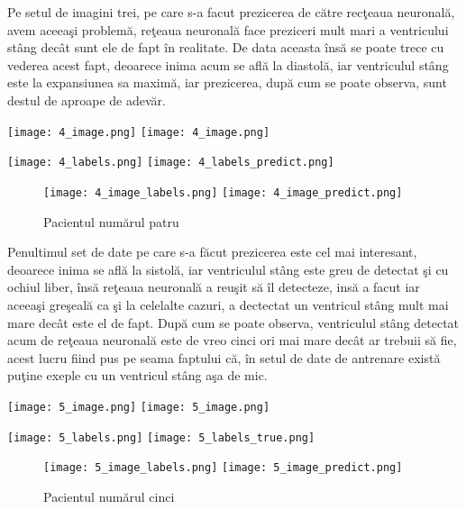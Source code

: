 Pe setul de imagini trei, pe care s-a facut prezicerea de c\u{a}tre rec\c{t}eaua neuronal\u{a}, avem aceea\c{s}i problem\u{a}, re\c{t}eaua neuronal\u{a} face preziceri mult mari a ventricului st\^{a}ng dec\^{a}t sunt ele de fapt \^{i}n realitate. De data aceasta \^{i}ns\u{a} se poate trece cu vederea acest fapt, deoarece inima acum se afl\u{a} la diastol\u{a}, iar ventriculul st\^{a}ng este la expansiunea sa maxim\u{a}, iar prezicerea, dup\u{a} cum se poate observa, sunt destul de aproape de adev\u{a}r.

\begin{center}
\texttt{[image: 4\_image.png]}
\texttt{[image: 4\_image.png]}
\end{center}

\begin{center}
\texttt{[image: 4\_labels.png]}
\texttt{[image: 4\_labels\_predict.png]}
\end{center}

\begin{figure}[h!]
  \center
  \texttt{[image: 4\_image\_labels.png]}
\texttt{[image: 4\_image\_predict.png]}
  \caption{Pacientul num\u{a}rul patru}
\end{figure}


Penultimul set de date pe care s-a f\u{a}cut prezicerea este cel mai interesant, deoarece inima se afl\u{a} la sistol\u{a}, iar ventriculul st\^{a}ng este greu de detectat \c{s}i cu ochiul liber, \^{i}ns\u{a} re\c{t}eaua neuronal\u{a} a reu\c{s}it s\u{a} \^{i}l detecteze, ins\u{a} a facut iar aceea\c{s}i gre\c{s}eal\u{a} ca \c{s}i la celelalte cazuri, a dectectat un ventricul st\^{a}ng mult mai mare dec\^{a}t este el de fapt. Dup\u{a} cum se poate observa, ventriculul st\^{a}ng detectat acum de re\c{t}eaua neuronal\u{a} este de vreo cinci ori mai mare dec\^{a}t ar trebuii s\u{a} fie, acest lucru fiind pus pe seama faptului c\u{a}, \^{i}n setul de date de antrenare exist\u{a} pu\c{t}ine exeple cu un ventricul st\^{a}ng a\c{s}a de mic.

\begin{center}
\texttt{[image: 5\_image.png]}
\texttt{[image: 5\_image.png]}
\end{center}

\begin{center}
\texttt{[image: 5\_labels.png]}
\texttt{[image: 5\_labels\_true.png]}
\end{center}

\begin{figure}[h!]
  \center
  \texttt{[image: 5\_image\_labels.png]}
\texttt{[image: 5\_image\_predict.png]}
  \caption{Pacientul num\u{a}rul cinci}
\end{figure}

